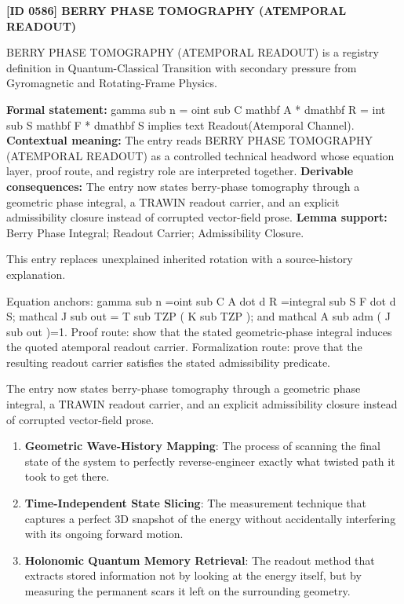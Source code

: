 \clearpage
\noindent\textbf{[ID 0586] BERRY PHASE TOMOGRAPHY (ATEMPORAL READOUT)}\par
\vspace{0.35em}
\begingroup\small
{}
BERRY PHASE TOMOGRAPHY (ATEMPORAL READOUT) is a registry definition in Quantum-Classical Transition with secondary pressure from Gyromagnetic and Rotating-Frame Physics.

\begingroup\footnotesize\setlength{\emergencystretch}{3em}\sloppy
\textbf{Formal statement:} gamma sub n = oint sub C mathbf A * dmathbf R = int sub S mathbf F * dmathbf S implies text Readout(Atemporal Channel). \textbf{Contextual meaning:} The entry reads BERRY PHASE TOMOGRAPHY (ATEMPORAL READOUT) as a controlled technical headword whose equation layer, proof route, and registry role are interpreted together. \textbf{Derivable consequences:} The entry now states berry-phase tomography through a geometric phase integral, a TRAWIN readout carrier, and an explicit admissibility closure instead of corrupted vector-field prose. \textbf{Lemma support:} Berry Phase Integral; Readout Carrier; Admissibility Closure.\par
\endgroup

This entry replaces unexplained inherited rotation with a source-history explanation.

Equation anchors: gamma sub n =oint sub C A dot d R =integral sub S F dot d S; mathcal J sub out = T sub TZP ( K sub TZP ); and mathcal A sub adm ( J sub out )=1. Proof route: show that the stated geometric-phase integral induces the quoted atemporal readout carrier. Formalization route: prove that the resulting readout carrier satisfies the stated admissibility predicate.

The entry now states berry-phase tomography through a geometric phase integral, a TRAWIN readout carrier, and an explicit admissibility closure instead of corrupted vector-field prose.
\endgroup

\begin{enumerate}[leftmargin=1.6em,itemsep=6pt,topsep=4pt]
\item \textbf{Geometric Wave-History Mapping}: The process of scanning the final state of the system to perfectly reverse-engineer exactly what twisted path it took to get there.
\item \textbf{Time-Independent State Slicing}: The measurement technique that captures a perfect 3D snapshot of the energy without accidentally interfering with its ongoing forward motion.
\item \textbf{Holonomic Quantum Memory Retrieval}: The readout method that extracts stored information not by looking at the energy itself, but by measuring the permanent scars it left on the surrounding geometry.
\end{enumerate}

